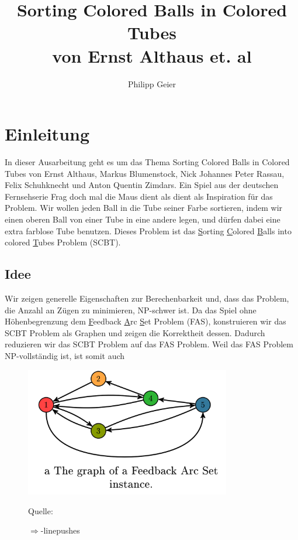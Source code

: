 \documentclass[seminar,german]{algothesis}
\title{Sorting Colored Balls in Colored Tubes \\ von Ernst Althaus et. al} %
\author{Philipp Geier} %
\newcommand*{\quelle}{%
  \footnotesize Quelle:
}
\begin{document}
\setcounter{page}{1}
\section{Einleitung}
In dieser Ausarbeitung geht es um das Thema \glqq Sorting Colored Balls in Colored Tubes\grqq{} von Ernst Althaus, Markus Blumenstock, Nick Johannes Peter Rassau, Felix Schuhknecht und Anton Quentin Zimdars. Ein Spiel aus der deutschen Fernsehserie \glqq Frag doch mal die Maus\grqq{} dient als dient als Inspiration für das Problem. Wir wollen jeden Ball in die Tube seiner Farbe sortieren, indem wir einen oberen Ball von einer Tube in eine andere legen, und dürfen dabei eine extra farblose Tube benutzen. Dieses Problem ist das \underline{S}orting \underline{C}olored \underline{B}alls into colored \underline{T}ubes Problem (SCBT).
\subsection{Idee}
Wir zeigen generelle Eigenschaften zur Berechenbarkeit und, dass das Problem, die Anzahl an Zügen zu minimieren, NP-schwer ist. Da das Spiel ohne Höhenbegrenzung dem \underline{F}eedback \underline{A}rc \underline{S}et Problem (FAS), konstruieren wir das SCBT Problem als Graphen und zeigen die Korrektheit dessen. Dadurch reduzieren wir das SCBT Problem auf das FAS Problem. Weil das FAS Problem NP-vollständig ist, ist somit auch 
\begin{figure}[ht]
	\centering
	\includegraphics[width=0.8\textwidth]{graph}
	\caption{$\Rightarrow$-linepushes}
	\quelle\cite{akitaya2022pushing}
	\label{fig:1}
\end{figure}

\newpage
\end{document}
